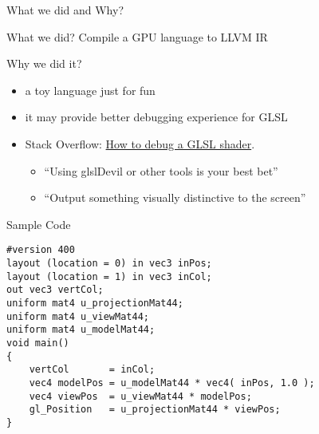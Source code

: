 \begin{frame}{What we did and Why?}
    \begin{block}{What we did?}
        Compile a GPU language to LLVM IR
    \end{block}

    \begin{block}{Why we did it?}
        \begin{itemize}
            \item a toy language just for fun
            \item it may provide better debugging experience for GLSL
            \item Stack Overflow: \href{https://stackoverflow.com/questions/2508818/how-to-debug-a-glsl-shader}{How to debug a GLSL shader}.
            \begin{itemize}
                \item ``Using glslDevil or other tools is your best bet''
                \item ``Output something visually distinctive to the screen''    
            \end{itemize}
        \end{itemize}
    \end{block}

\end{frame}

\begin{frame}[fragile]{Sample Code}
   \begin{lstlisting}
#version 400
layout (location = 0) in vec3 inPos;
layout (location = 1) in vec3 inCol;
out vec3 vertCol;
uniform mat4 u_projectionMat44;
uniform mat4 u_viewMat44;
uniform mat4 u_modelMat44;
void main()
{
    vertCol       = inCol;
    vec4 modelPos = u_modelMat44 * vec4( inPos, 1.0 );
    vec4 viewPos  = u_viewMat44 * modelPos;
    gl_Position   = u_projectionMat44 * viewPos;
}
   \end{lstlisting}
\end{frame}

